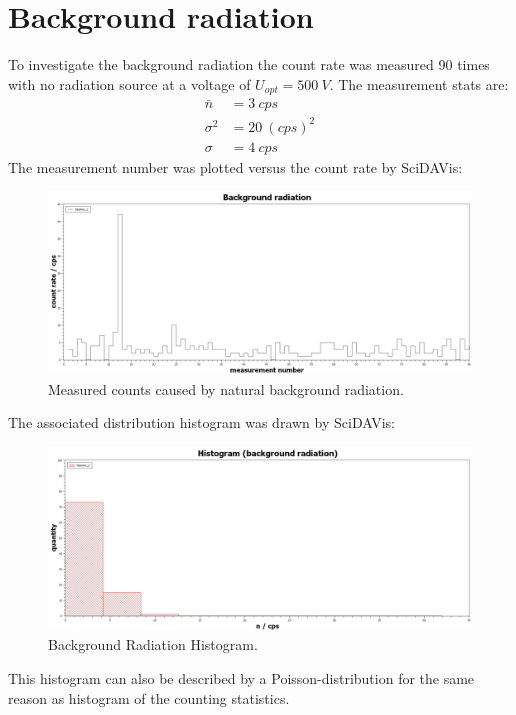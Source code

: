 \section{Background radiation}
%
To investigate the background radiation the count rate was measured 90 times with no radiation source at a voltage of
\( U_{opt}=\SI{500}{V} \). The measurement stats are:
%
\begin{align}
\bar{n}     &=  \SI{3}{cps} \\
\sigma^{2}  &=  \SI{20}{(cps)^{2}} \\
\sigma      &=  \SI{4}{cps}
\end{align}
The measurement number was plotted versus the count rate by SciDAVis:
\begin{figure}[H]
 \centering
 \includegraphics[width=.8\textwidth]{scidavis/Fig.10_Background radiation.jpg}
 \caption[Background radiation cps]{Measured counts caused by natural background radiation.}
 \label{fig:backgroundRad}
\end{figure}
The associated distribution histogram was drawn by SciDAVis:
\begin{figure}[H]
 \centering
 \includegraphics[width=.8\textwidth]{scidavis/Fig.11_Histogram (background radiation).jpg}
 \caption[Back Rad Hist]{Background Radiation Histogram.}
 \label{fig:backgroundRadHistogram}
\end{figure}
This histogram can also be described by a Poisson-distribution for the same reason as histogram of the counting
statistics.
%
